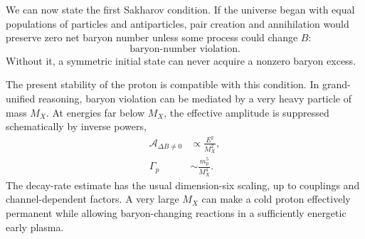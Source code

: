 \begin{classroomqa}
\end{classroomqa}

We can now state the first Sakharov condition. If the universe began with equal populations of particles and antiparticles, pair creation and annihilation would preserve zero net baryon number unless some process could change \(B\):
\begin{equation}
\boxed{\text{baryon-number violation}.}
\end{equation}
Without it, a symmetric initial state can never acquire a nonzero baryon excess.

The present stability of the proton is compatible with this condition. In grand-unified reasoning, baryon violation can be mediated by a very heavy particle of mass \(M_X\). At energies far below \(M_X\), the effective amplitude is suppressed schematically by inverse powers,
\begin{equation}
\begin{aligned}
\mathcal A_{\Delta B\ne0}&\propto \frac{E^2}{M_X^2},\\
\Gamma_p&\sim \frac{m_p^5}{M_X^4}.
\end{aligned}
\label{eq:c08-heavy-suppression}
\end{equation}
The decay-rate estimate has the usual dimension-six scaling, up to couplings and channel-dependent factors. A very large \(M_X\) can make a cold proton effectively permanent while allowing baryon-changing reactions in a sufficiently energetic early plasma.

\begin{classroomqa}
\end{classroomqa}

